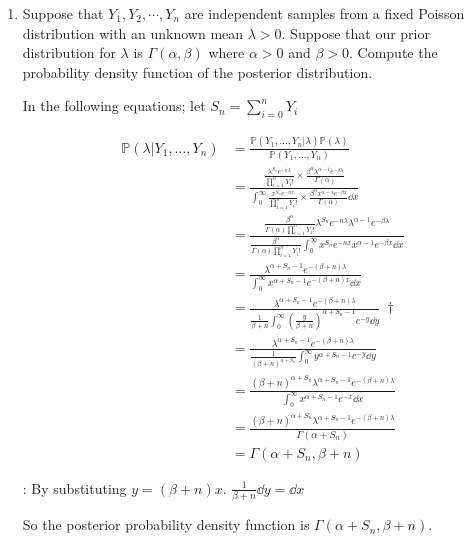 \documentclass[10pt,\jkfside,a4paper]{article}
\begin{document}
\begin{enumerate}

\item Suppose that $Y_1,Y_2,\cdots,Y_n$ are independent samples from a fixed Poisson distribution with
an unknown mean $\lambda > 0$.
Suppose that our prior distribution for $\lambda$ is $\Gamma(\alpha, \beta)$
where $\alpha > 0$ and $\beta > 0$.
Compute the probability density function of the posterior distribution.

In the following equations;
let $S_n = \sum^n_{i=0} Y_i$

\[
\begin{split}
\mathbb{P}(\lambda|Y_1,\dots,Y_n) &= \frac{\mathbb{P}(Y_1,\dots,Y_n|\lambda)\mathbb{P}(\lambda)}{\mathbb{P}(Y_1,
\dots,Y_n)} \\
&= \frac{\frac{\lambda^{S_n}e^{-n\lambda}}{\prod^n_{i=1}Y_i!}\times \frac{\beta^\alpha \lambda^{\alpha -
1} e^{-\beta \lambda}}{\Gamma(\alpha)}}{\int^\infty_0
\frac{x^{S_n}e^{-nx}}{\prod^n_{i=1}Y_i!}\times \frac{\beta^\alpha x^{\alpha -
1} e^{-\beta x}}{\Gamma(\alpha)}\dd{x}} \\
&= \frac{\frac{\beta^\alpha}{\Gamma(\alpha)\prod^n_{i=1}Y_i!}\lambda^{S_n}e^{-n\lambda}
\lambda^{\alpha - 1} e^{-\beta \lambda}}{\frac{\beta^\alpha}{\Gamma(\alpha)\prod^n_{i=1}Y_i!}\int^\infty_0
x^{S_n}e^{-nx}x^{\alpha -
1} e^{-\beta x}\dd{x}} \\
&= \frac{\lambda^{\alpha + S_n - 1} e^{-(\beta + n) \lambda}}{\int^\infty_0
x^{\alpha + S_n - 1} e^{-(\beta + n) x}\dd{x}} \\
&= \frac{\lambda^{\alpha + S_n - 1} e^{-(\beta + n) \lambda}}{\frac{1}{\beta + n}\int^\infty_0
\left(\frac{y}{\beta + n}\right)^{\alpha + S_n - 1} e^{-y}\dd{y}} \ \dag \\
&= \frac{\lambda^{\alpha + S_n - 1} e^{-(\beta + n) \lambda}}{\frac{1}{(\beta + n)^{\alpha + S_n}}\int^\infty_0 y^{\alpha + S_n - 1} e^{-y}\dd{y}} \\
&= \frac{(\beta + n)^{\alpha + S_n}\lambda^{\alpha + S_n - 1} e^{-(\beta + n) \lambda}}{\int^\infty_0 x^{\alpha +
S_n - 1} e^{-x}\dd{x}} \\
&= \frac{(\beta + n)^{\alpha + S_n}\lambda^{\alpha + S_n - 1} e^{-(\beta + n) \lambda}}{\Gamma(\alpha + S_n)} \\
&= \Gamma(\alpha + S_n, \beta + n)
\end{split}
\]

\dag:
By substituting $y = (\beta + n)x$. $\frac{1}{\beta + n}\dd{y} = \dd{x}$

So the posterior probability density function is $\Gamma(\alpha + S_n, \beta + n)$.


\end{enumerate}
\end{document}

